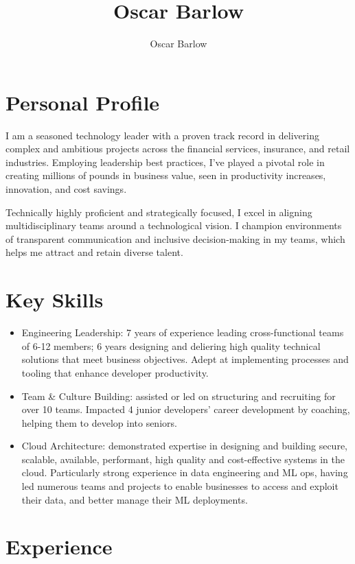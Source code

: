 \documentclass[a4paper]{scrartcl}
\author{Oscar Barlow}
\title{Oscar Barlow}
\date{}
\begin{document}
\maketitle

\section*{Personal Profile}
 { %
  \setlength{\parskip}{6pt plus 2pt minus 1pt}
  I am a seasoned technology leader with a proven track record in
  delivering complex and ambitious projects across the financial services,
  insurance,
  and retail industries. Employing leadership best practices, I've played a pivotal role in creating
  millions of pounds in business value, seen in
  productivity increases, innovation, and cost savings.

  Technically highly proficient and strategically focused, I excel in aligning
  multidisciplinary
  teams around a technological vision. I champion environments of
  transparent communication and inclusive decision-making in my teams, which helps me attract and retain diverse talent.
 } %

\section*{Key Skills}
\begin{itemize}
	\item Engineering Leadership: 7 years of experience leading cross-functional teams of 6-12 members; 6 years designing and deliering high quality technical solutions that meet business objectives. Adept at implementing processes and tooling that enhance developer productivity.
	\item Team \& Culture Building: assisted or led on structuring and recruiting for over 10 teams. Impacted 4 junior developers' career development by coaching, helping them to develop into seniors.
	\item Cloud Architecture: demonstrated expertise in designing and building secure,
	      scalable, available, performant, high quality and cost-effective
	      systems in the
	      cloud. Particularly strong experience in data engineering and ML ops, having led numerous teams and projects to enable businesses to access and exploit their data, and better manage their ML deployments.
\end{itemize}

\section*{Experience}
\end{document}
